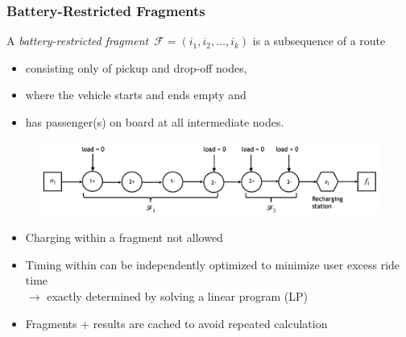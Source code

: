 \documentclass[aspectratio=1610]{beamer}
\newcommand{\important}[1]{{\color{green!60!black}#1}}
\let\oldfootnotesize\footnotesize
\renewcommand*{\footnotesize}{\oldfootnotesize\fontsize{6}{4}\selectfont}
\renewcommand{\footnotesize}{\scriptsize}
\begin{document}
\begin{frame}
\frametitle{Battery-Restricted Fragments} %

A \important{\emph{battery-restricted fragment}}~$\mathcal{F} = (i_1, i_2, \dots, i_k)$ is a subsequence of a route
\begin{itemize}
	\item consisting only of \important{pickup and drop-off nodes}, \item where the vehicle \important{starts and ends empty} and
	\item has passenger(s) on board at all intermediate nodes.
\end{itemize}
	
\begin{figure}
	\centering
	\includegraphics[scale=0.42]{graphics/battery-restricted-fragment-example.png}
\end{figure}

\begin{itemize}
	\item Charging within a fragment not allowed
	\item Timing within can be \important{independently optimized} to \important{minimize user excess ride time}\\ %
	$\rightarrow$ exactly determined by solving a \important{linear program (LP)}
	\item Fragments + results are \important{cached} to avoid repeated calculation
\end{itemize}

\end{frame}
  
\end{document}
